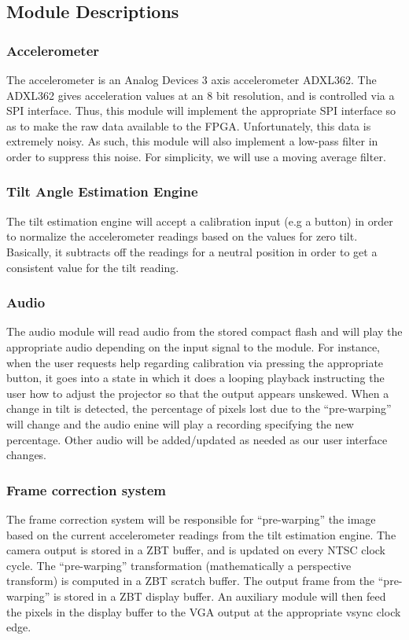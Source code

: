 \documentclass{article}
\begin{document}
\subsection{Module Descriptions}

\subsubsection{Accelerometer}
The accelerometer is an Analog Devices 3 axis accelerometer ADXL362.
The ADXL362 gives acceleration values at an 8 bit resolution, and is controlled via a SPI interface.
Thus, this module will implement the appropriate SPI interface so as to make the raw data available to the FPGA.
Unfortunately, this data is extremely noisy.
As such, this module will also implement a low-pass filter in order to suppress this noise.
For simplicity, we will use a moving average filter.

\subsubsection{Tilt Angle Estimation Engine}
The tilt estimation engine will accept a calibration input (e.g a button) in order to normalize the accelerometer readings based on the values for zero tilt.
Basically, it subtracts off the readings for a neutral position in order to get a consistent value for the tilt reading.

\subsubsection{Audio}
The audio module will read audio from the stored compact flash and will play the appropriate audio depending on the input signal to the module.
For instance, when the user requests help regarding calibration via pressing the appropriate button,
it goes into a state in which it does a looping playback instructing the user how to adjust the projector so that the output appears unskewed.
When a change in tilt is detected,
the percentage of pixels lost due to the ``pre-warping'' will change and the audio enine will play a recording specifying the new percentage.
Other audio will be added/updated as needed as our user interface changes.

\subsubsection{Frame correction system}
The frame correction system will be responsible for ``pre-warping'' the image based on the current accelerometer readings from the tilt estimation engine.
The camera output is stored in a ZBT buffer, and is updated on every NTSC clock cycle.
The ``pre-warping'' transformation (mathematically a perspective transform) is computed in a ZBT scratch buffer.
The output frame from the ``pre-warping'' is stored in a ZBT display buffer.
An auxiliary module will then feed the pixels in the display buffer to the VGA output at the appropriate vsync clock edge.
\end{document}
